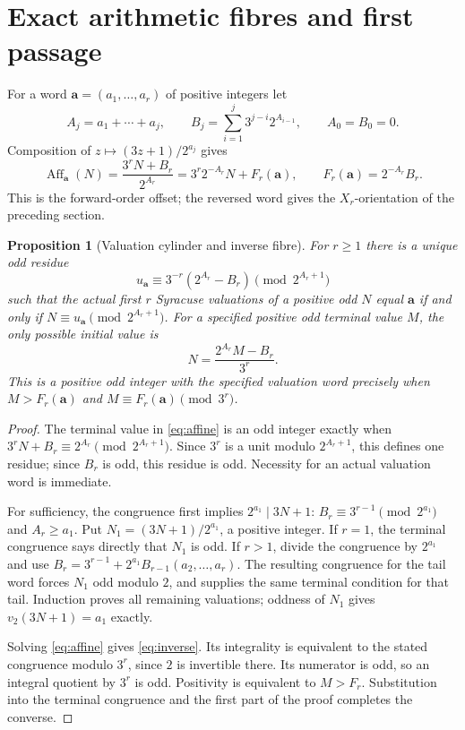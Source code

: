 \documentclass[11pt]{article}
\newtheorem{proposition}{Proposition}
\theoremstyle{remark}\newtheorem{remark}[proposition]{Remark}
\newcommand{\Aff}{\operatorname{Aff}}
\begin{document}
\section{Exact arithmetic fibres and first passage}

For a word $\mathbf a=(a_1,\ldots,a_r)$ of positive integers let
\[
 A_j=a_1+\cdots+a_j,\qquad
 B_j=\sum_{i=1}^j3^{j-i}2^{A_{i-1}},\qquad A_0=B_0=0.
\]
Composition of $z\mapsto(3z+1)/2^{a_j}$ gives
\begin{equation}\label{eq:affine}
 \Aff_{\mathbf a}(N)=\frac{3^rN+B_r}{2^{A_r}}
 =3^r2^{-A_r}N+F_r(\mathbf a),\qquad
 F_r(\mathbf a)=2^{-A_r}B_r.
\end{equation}
This is the forward-order offset; the reversed word gives the
$X_r$-orientation of the preceding section.

\begin{proposition}[Valuation cylinder and inverse fibre]\label{prop:fibre}
For $r\geq1$ there is a unique odd residue
\[
 u_{\mathbf a}\equiv3^{-r}(2^{A_r}-B_r)\pmod{2^{A_r+1}}
\]
such that the actual first $r$ Syracuse valuations of a positive odd $N$
equal $\mathbf a$ if and only if $N\equiv u_{\mathbf a}\pmod{2^{A_r+1}}$.
For a specified positive odd terminal value $M$, the only possible initial
value is
\begin{equation}\label{eq:inverse}
 N=\frac{2^{A_r}M-B_r}{3^r}.
\end{equation}
This is a positive odd integer with the specified valuation word precisely
when $M>F_r(\mathbf a)$ and
$M\equiv F_r(\mathbf a)\pmod{3^r}$.
\end{proposition}
\begin{proof}
The terminal value in \eqref{eq:affine} is an odd integer exactly when
$3^rN+B_r\equiv2^{A_r}\pmod{2^{A_r+1}}$. Since $3^r$ is a unit modulo
$2^{A_r+1}$, this defines one residue; since $B_r$ is odd, this residue
is odd. Necessity for an actual valuation word is immediate.

For sufficiency, the congruence first implies $2^{a_1}\mid3N+1$:
$B_r\equiv3^{r-1}\pmod{2^{a_1}}$ and $A_r\geq a_1$.
Put $N_1=(3N+1)/2^{a_1}$, a positive integer. If $r=1$, the terminal
congruence says directly that $N_1$ is odd. If $r>1$, divide the
congruence by $2^{a_1}$ and use
$B_r=3^{r-1}+2^{a_1}B_{r-1}(a_2,\ldots,a_r)$.
The resulting congruence for the tail word forces $N_1$ odd modulo $2$,
and supplies the same terminal condition for that tail. Induction proves
all remaining valuations; oddness of $N_1$ gives $v_2(3N+1)=a_1$ exactly.

Solving \eqref{eq:affine} gives \eqref{eq:inverse}. Its integrality is
equivalent to the stated congruence modulo $3^r$, since $2$ is invertible
there. Its numerator is odd, so an integral quotient by $3^r$ is odd.
Positivity is equivalent to $M>F_r$. Substitution into the terminal
congruence and the first part of the proof completes the converse.
\end{proof}
\end{document}
